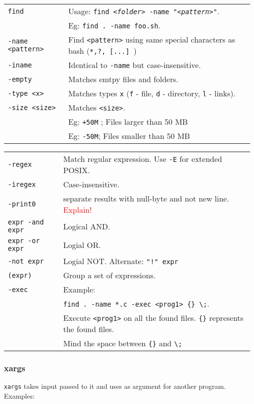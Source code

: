 \begin{tabularx}{\linewidth}{lX}
\texttt{find} & Usage: \texttt{find \textit{<folder>} -name "\textit{<pattern>}"}.\\
& Eg: \texttt{find . -name foo.sh}.\\
\texttt{-name <pattern>} & Find \texttt{<pattern>} using same special characters as bash (\texttt{*,?, [...] })\\
\texttt{-iname} & Identical to \texttt{-name} but case-insensitive.\\
\texttt{-empty} & Matches emtpy files and folders.\\
\texttt{-type <x>} & Matches types \texttt{x} (\texttt{f} - file, \texttt{d} - directory, \texttt{l} - links).\\
\texttt{-size <size>} & Matches \texttt{<size>}.\\
&  Eg: \texttt{+50M} ; Files larger than 50 MB\\
& Eg: \texttt{-50M}; Files smaller than 50 MB\\
\end{tabularx}

\begin{tabularx}{\linewidth}{lX}

\texttt{-regex} & Match regular expression. Use \texttt{-E} for extended POSIX.\\
\texttt{-iregex} & Case-insensitive.\\
\texttt{-print0} & separate results with null-byte and not new line. 
\textcolor{red}{Explain!}\\
\texttt{expr -and expr} & Logical AND.\\
\texttt{expr -or expr} & Logial OR.\\
\texttt{-not expr} & Logial NOT. Alternate: \texttt{"!" expr}\\
\texttt{(expr)} & Group a set of expressions.\\
\texttt{-exec} & Example: \\
 & \texttt{find . -name *.c -exec <prog1> \{\} \textbackslash ;}.\\
 & Execute \texttt{<prog1>} on all the found files. \texttt{\{\}} represents the found files. \\
 & Mind the space between \texttt{\{\}} and \texttt{\textbackslash;}\\
 
\hline

\end{tabularx}


\subsubsection{xargs}
\texttt{xargs} takes input passed to it and uses as argument for another program.\\
Examples:

